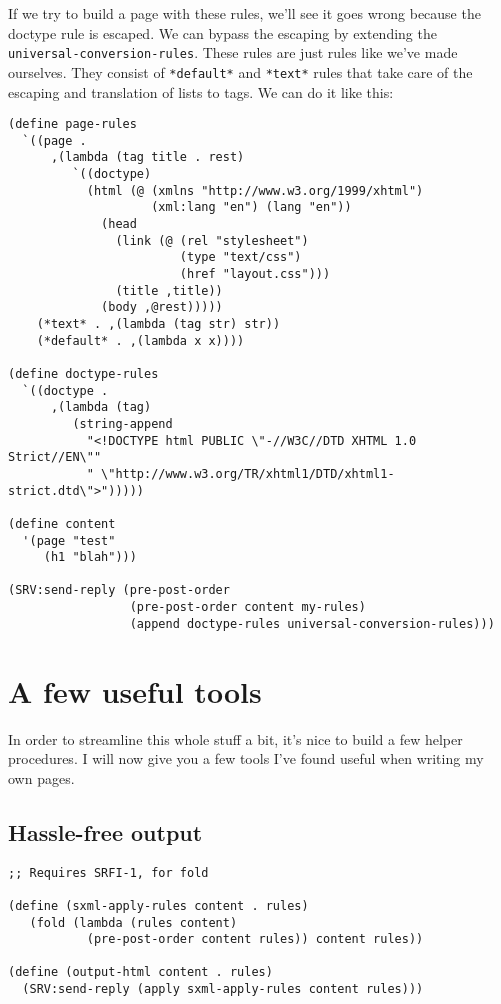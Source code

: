 \documentclass{article}
\begin{document}
If we try to build a page with these rules, we'll see it goes wrong
because the doctype rule is escaped.  We can bypass the escaping by
extending the \verb|universal-conversion-rules|.  These rules are just
rules like we've made ourselves.  They consist of \verb|*default*| and
\verb|*text*| rules that take care of the escaping and translation of
lists to tags.  We can do it like this:

\begin{verbatim}
(define page-rules
  `((page .
      ,(lambda (tag title . rest)
         `((doctype)
           (html (@ (xmlns "http://www.w3.org/1999/xhtml")
                    (xml:lang "en") (lang "en"))
             (head
               (link (@ (rel "stylesheet")
                        (type "text/css")
                        (href "layout.css")))
               (title ,title))
             (body ,@rest)))))
    (*text* . ,(lambda (tag str) str))
    (*default* . ,(lambda x x))))

(define doctype-rules
  `((doctype .
      ,(lambda (tag)
         (string-append
           "<!DOCTYPE html PUBLIC \"-//W3C//DTD XHTML 1.0 Strict//EN\""
           " \"http://www.w3.org/TR/xhtml1/DTD/xhtml1-strict.dtd\">")))))

(define content
  '(page "test"
     (h1 "blah")))

(SRV:send-reply (pre-post-order
                 (pre-post-order content my-rules)
                 (append doctype-rules universal-conversion-rules)))
\end{verbatim}

\section{A few useful tools}

In order to streamline this whole stuff a bit, it's nice to build a
few helper procedures.  I will now give you a few tools I've found
useful when writing my own pages.

\subsection{Hassle-free output}

\begin{verbatim}
;; Requires SRFI-1, for fold

(define (sxml-apply-rules content . rules)
   (fold (lambda (rules content)
           (pre-post-order content rules)) content rules))

(define (output-html content . rules)
  (SRV:send-reply (apply sxml-apply-rules content rules)))
\end{verbatim}
\end{document}
